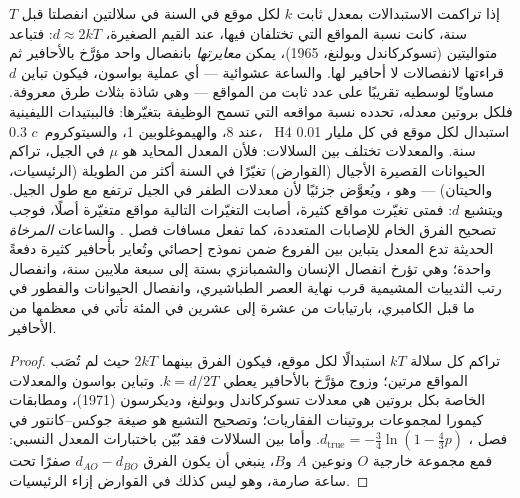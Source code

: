 \begin{proposition}\label{prop:b3:molecular-evolution:clock}
إذا تراكمت الاستبدالات بمعدل ثابت $k$ لكل موقع في السنة في
سلالتين انفصلتا قبل $T$ سنة، كانت نسبة المواقع التي تختلفان
فيها، عند القيم الصغيرة، $d \approx 2kT$: فتباعد
متواليتين \emph{} (تسوكركاندل وبولنغ،
1965)، يمكن \emph{معايرتها} بانفصال واحد مؤرَّخ بالأحافير ثم
قراءتها لانفصالات لا أحافير لها. والساعة عشوائية --- أي عملية
بواسون، فيكون تباين $d$ مساويًا لوسطيه تقريبًا على عدد ثابت
من المواقع --- وهي شاذة بثلاث طرق معروفة. فلكل بروتين معدله،
تحدده نسبة مواقعه التي تسمح الوظيفة بتغيّرها: فالببتيدات
الليفينية عند \num{8}، والهيموغلوبين
\num{1}، والسيتوكروم~$c$ \num{0.3}، ~H4 \num{0.01} استبدال
لكل موقع في كل مليار سنة. والمعدلات تختلف بين السلالات: فلأن
المعدل المحايد هو $\mu$ في الجيل، تراكم الحيوانات القصيرة
الأجيال (القوارض) تغيّرًا في السنة أكثر من الطويلة
(الرئيسيات، والحيتان) --- وهو \emph{}، ويُعوَّض
جزئيًا لأن معدلات الطفر في الجيل ترتفع مع طول الجيل.
ويتشبع $d$: فمتى تغيّرت مواقع كثيرة، أصابت التغيّرات التالية
مواقع متغيّرة أصلًا، فوجب تصحيح الفرق الخام للإصابات
المتعددة، كما تفعل مسافات فصل . والساعات
\emph{المرخاة} الحديثة تدع المعدل يتباين بين الفروع ضمن نموذج
إحصائي وتُعاير بأحافير كثيرة دفعةً واحدة؛ وهي تؤرخ انفصال
الإنسان والشمبانزي بستة إلى سبعة ملايين سنة، وانفصال رتب
الثدييات المشيمية قرب نهاية العصر الطباشيري، وانفصال
الحيوانات والفطور في ما قبل الكامبري، بارتيابات من عشرة إلى
عشرين في المئة تأتي في معظمها من الأحافير.
\end{proposition}
\begin{proof}
تراكم كل سلالة $kT$ استبدالًا لكل موقع، فيكون الفرق بينهما
$2kT$ حيث لم تُصَب المواقع مرتين؛ وزوج مؤرَّخ بالأحافير يعطي
$k = d/2T$. وتباين بواسون والمعدلات الخاصة بكل بروتين هي
معدلات تسوكركاندل وبولنغ، وديكرسون (1971)، ومطابقات كيمورا
لمجموعات بروتينات الفقاريات؛ وتصحيح التشبع هو صيغة
جوكس--كانتور في فصل ، $d_{\text{true}} =
-\tfrac{3}{4}\ln(1 - \tfrac{4}{3}p)$. وأما  بين
السلالات فقد بُيّن باختبارات المعدل النسبي: فمع مجموعة خارجية
$O$ ونوعين $A$ و$B$، ينبغي أن يكون الفرق $d_{AO} - d_{BO}$
صفرًا تحت ساعة صارمة، وهو ليس كذلك في القوارض إزاء الرئيسيات.
\end{proof}

